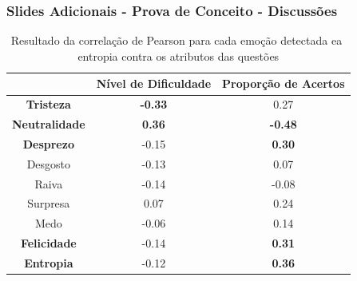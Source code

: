 

\begin{frame}
\frametitle{Slides Adicionais - Prova de Conceito - Discussões}
\begin{table}[]\footnotesize
\centering
\caption{Resultado​ ​da​ ​correla\c{c}\~ao​ ​de​ ​Pearson​ ​para​ ​cada​ ​emo\c{c}\~ao​ ​detectada
e​ ​a​ ​entropia​ ​contra​ ​os​ ​atributos​ ​das​ ​quest\~oes}
\label{my-label}
\begin{tabular}{|c|c|c|}
\hline
                      & \textbf{Nível de Dificuldade} & \textbf{Proporção de Acertos} \\ \hline
\textbf{Tristeza}     & \textbf{-0.33}                & 0.27                          \\ \hline
\textbf{Neutralidade} & \textbf{0.36}                 & \textbf{-0.48}                \\ \hline
\textbf{Desprezo}     & -0.15                         & \textbf{0.30}                 \\ \hline
Desgosto              & -0.13                         & 0.07                          \\ \hline
Raiva                 & -0.14                         & -0.08                         \\ \hline
Surpresa              & 0.07                          & 0.24                          \\ \hline
Medo                  & -0.06                         & 0.14                          \\ \hline
\textbf{Felicidade}   & -0.14                         & \textbf{0.31}                 \\ \hline
\textbf{Entropia}     & -0.12                         & \textbf{0.36}                 \\ \hline
\end{tabular}
\end{table}
\end{frame}


